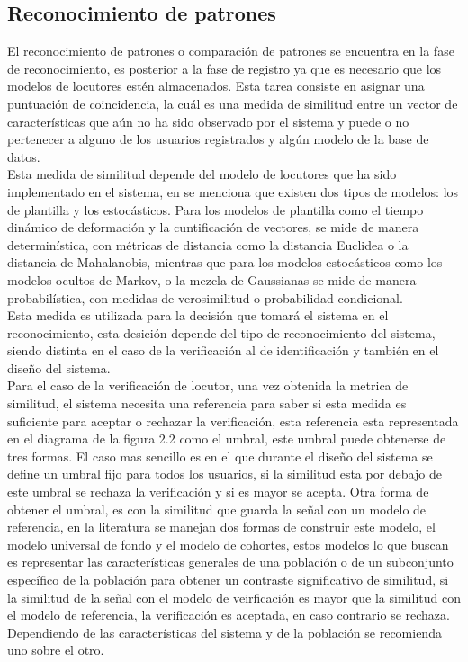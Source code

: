  


\subsection{Reconocimiento de patrones}

El reconocimiento de patrones o comparaci\'on de patrones se encuentra en la fase de reconocimiento, es posterior a la fase de registro ya que es necesario que los modelos de locutores est\'en almacenados. Esta tarea consiste en asignar una puntuaci\'on de coincidencia, la cu\'al es una medida de similitud entre un vector de caracter\'isticas que a\'un no ha sido observado por el sistema y puede o no pertenecer a alguno de los usuarios registrados y alg\'un modelo de la base de datos.\\

Esta medida de similitud depende del modelo de locutores que ha sido implementado en el sistema, en \cite{campbell1997} se menciona que existen dos tipos de modelos: los de plantilla y los estoc\'asticos. Para los modelos de plantilla como el tiempo din\'amico de deformaci\'on y la cuntificaci\'on de vectores, se mide de manera determin\'istica, con m\'etricas de distancia como la distancia Euclidea o la distancia de Mahalanobis, mientras que para los modelos estoc\'asticos como los modelos ocultos de Markov, o la mezcla de Gaussianas se mide de manera probabil\'istica, con medidas de verosimilitud o probabilidad condicional.\\

Esta medida es utilizada para la decisi\'on que tomar\'a el sistema en el reconocimiento, esta desici\'on depende del tipo de reconocimiento del sistema, siendo distinta en el caso de la verificaci\'on al de identificaci\'on y tambi\'en en el diseño del sistema.\\ 

Para el caso de la verificaci\'on de locutor, una vez obtenida la metrica de similitud, el sistema necesita una referencia para saber si esta medida es suficiente para aceptar o rechazar la verificaci\'on, esta referencia esta representada en el diagrama de la figura 2.2 como el umbral, este umbral puede obtenerse de tres formas. El caso mas sencillo es en el que durante el diseño del sistema se define un umbral fijo para todos los usuarios, si la similitud esta por debajo de este umbral se rechaza la verificaci\'on y si es mayor se acepta. Otra forma de obtener el umbral, es con la similitud que guarda la señal con un modelo de referencia, en la literatura se manejan dos formas de construir este modelo, el modelo universal de fondo y el modelo de cohortes, estos modelos lo que buscan es representar las caracter\'isticas generales de una poblaci\'on o de un subconjunto espec\'ifico de la poblaci\'on para obtener un contraste significativo de similitud, si la similitud de la señal con el modelo de veirficaci\'on es mayor que la similitud con el modelo de referencia, la verificaci\'on es aceptada, en caso contrario se rechaza. Dependiendo de las caracter\'isticas del sistema y de la poblaci\'on se recomienda uno sobre el otro.\\



